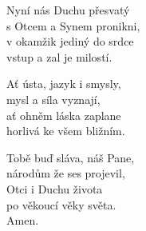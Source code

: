 \begin{translatioMulticol}{3}
Nyní nás Duchu přesvatý\\
s Otcem a Synem pronikni,\\
v okamžik jediný do srdce\\
vstup a zal\ij{} je milostí.\columnbreak

Ať ústa, jazyk i smysly,\\
mysl a síla vyznají,\\
ať ohněm láska zaplane\\
horlivá ke všem bližním.\columnbreak

Tobě buď sláva, náš Pane,\\
národům že ses projevil,\\
Otci i Duchu života\\
po věkoucí věky světa.\\
Amen.
\end{translatioMulticol}
